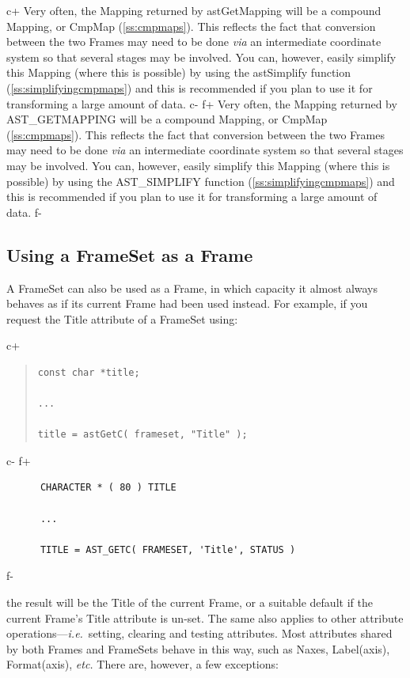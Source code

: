 \documentclass[twoside,11pt]{article}
\newcommand{\secref}[1]{\S\ref{#1}}
\renewcommand{\secref}[1]{\ref{#1}}
\begin{document}
c+
Very often, the Mapping returned by astGetMapping will be a compound
Mapping, or CmpMap (\secref{ss:cmpmaps}). This reflects the fact that
conversion between the two Frames may need to be done {\em{via}} an
intermediate coordinate system so that several stages may be involved.
You can, however, easily simplify this Mapping (where this is possible)
by using the astSimplify function (\secref{ss:simplifyingcmpmaps}) and
this is recommended if you plan to use it for transforming a large
amount of data.
c-
f+
Very often, the Mapping returned by AST\_GETMAPPING will be a compound
Mapping, or CmpMap (\secref{ss:cmpmaps}). This reflects the fact that
conversion between the two Frames may need to be done {\em{via}} an
intermediate coordinate system so that several stages may be involved.
You can, however, easily simplify this Mapping (where this is possible)
by using the AST\_SIMPLIFY function (\secref{ss:simplifyingcmpmaps})
and this is recommended if you plan to use it for transforming a large
amount of data.
f-

\subsection{\label{ss:framesetasframe}Using a FrameSet as a Frame}

A FrameSet can also be used as a Frame, in which capacity it almost
always behaves as if its current Frame had been used instead. For
example, if you request the Title attribute of a FrameSet using:

c+
\begin{quote}
\small
\begin{verbatim}
const char *title;

...

title = astGetC( frameset, "Title" );
\end{verbatim}
\normalsize
\end{quote}
c-
f+
\small
\begin{verbatim}
      CHARACTER * ( 80 ) TITLE

      ...

      TITLE = AST_GETC( FRAMESET, 'Title', STATUS )
\end{verbatim}
\normalsize
f-

the result will be the Title of the current Frame, or a suitable
default if the current Frame's Title attribute is un-set. The same
also applies to other attribute operations---{\em{i.e.}}\ setting,
clearing and testing attributes.  Most attributes shared by both
Frames and FrameSets behave in this way, such as Naxes, Label(axis),
Format(axis), {\em{etc.}} There are, however, a few exceptions:
\end{document}
